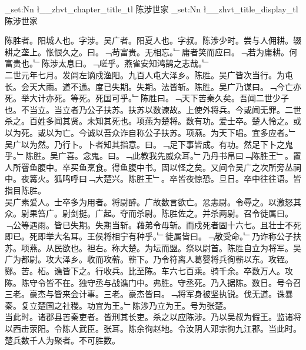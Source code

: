 \documentclass{zhvt-classic}
\begin{document}
\clearpage
\ExplSyntaxOn
\tl_set:Nn \l__zhvt_chapter_title_tl { 陈涉世家 }
\tl_set:Nn \l__zhvt_title_display_tl { 陈涉世家 }
\ExplSyntaxOff
\maketitle


\hspace*{2em}陈胜者。阳城人也。字涉。吴广者。阳夏人也。字叔。陈涉少时。尝与人佣耕。辍耕之垄上。怅恨久之。曰。﹁苟富贵。无相忘。﹂庸者笑而应曰。﹁若为庸耕。何富贵也。﹂陈涉太息曰。﹁嗟乎。燕雀安知鸿鹄之志哉。﹂\\
\hspace*{2em}二世元年七月。发闾左谪戍渔阳。九百人屯大泽乡。陈胜。吴广皆次当行。为屯长。会天大雨。道不通。度已失期。失期。法皆斩。陈胜。吴广乃谋曰。﹁今亡亦死。举大计亦死。等死。死国可乎。﹂陈胜曰。﹁天下苦秦久矣。吾闻二世少子也。不当立。当立者乃公子扶苏。扶苏以数谏故。上使外将兵。今或闻无罪。二世杀之。百姓多闻其贤。未知其死也。项燕为楚将。数有功。爱士卒。楚人怜之。或以为死。或以为亡。今诚以吾众诈自称公子扶苏。项燕。为天下唱。宜多应者。﹂吴广以为然。乃行卜。卜者知其指意。曰。﹁足下事皆成。有功。然足下卜之鬼乎。﹂陈胜。吴广喜。念鬼。曰。﹁此教我先威众耳。﹂乃丹书帛曰﹁陈胜王﹂。置人所罾鱼腹中。卒买鱼烹食。得鱼腹中书。固以怪之矣。又间令吴广之次所旁丛祠中。夜篝火。狐鸣呼曰﹁大楚兴。陈胜王﹂。卒皆夜惊恐。旦日。卒中往往语。皆指目陈胜。\\
\hspace*{2em}吴广素爱人。士卒多为用者。将尉醉。广故数言欲亡。忿恚尉。令辱之。以激怒其众。尉果笞广。尉剑挺。广起。夺而杀尉。陈胜佐之。并杀两尉。召令徒属曰。﹁公等遇雨。皆已失期。失期当斩。藉弟令毋斩。而戍死者固十六七。且壮士不死即已。死即举大名耳。王侯将相宁有种乎。﹂徒属皆曰。﹁敬受命。﹂乃诈称公子扶苏。项燕。从民欲也。袒右。称大楚。为坛而盟。祭以尉首。陈胜自立为将军。吴广为都尉。攻大泽乡。收而攻蕲。蕲下。乃令符离人葛婴将兵徇蕲以东。攻铚。酂。苦。柘。谯皆下之。行收兵。比至陈。车六七百乘。骑千余。卒数万人。攻陈。陈守令皆不在。独守丞与战谯门中。弗胜。守丞死。乃入据陈。数日。号令召三老。豪杰与皆来会计事。三老。豪杰皆曰。﹁将军身被坚执锐。伐无道。诛暴秦。复立楚国之社稷。功宜为王。﹂陈涉乃立为王。号为张楚。\\
\hspace*{2em}当此时。诸郡县苦秦吏者。皆刑其长吏。杀之以应陈涉。乃以吴叔为假王。监诸将以西击荥阳。令陈人武臣。张耳。陈余徇赵地。令汝阴人邓宗徇九江郡。当此时。楚兵数千人为聚者。不可胜数。\\
\end{document}
